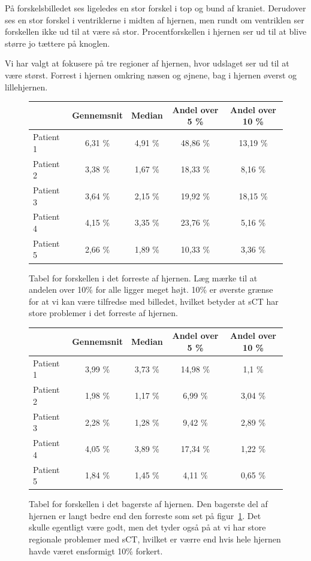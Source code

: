 På forskelsbilledet ses ligeledes en stor forskel i top og bund af
kraniet. Derudover ses en stor forskel i ventriklerne i midten af
hjernen, men rundt om ventriklen ser forskellen ikke ud til at være så
stor. Procentforskellen i hjernen ser ud til at blive større jo tættere
på knoglen.

Vi har valgt at fokusere på tre regioner af hjernen, hvor udslaget ser ud
til at være størst. Forrest i hjernen omkring næsen og øjnene, bag
i hjernen øverst og lillehjernen.

\begin{figure}
    \centering
    \begin{tabular}{| l | c | c | c | c |}
        \hline
         & Gennemsnit & Median & Andel over 5 \% & Andel over 10 \% \\ \hline
        Patient 1 & 6,31 \% & 4,91 \% & 48,86 \% & 13,19 \% \\ \hline
        Patient 2 & 3,38 \% & 1,67 \% & 18,33 \% & 8,16 \% \\ \hline
        Patient 3 & 3,64 \% & 2,15 \% & 19,92 \% & 18,15 \% \\ \hline
        Patient 4 & 4,15 \% & 3,35 \% & 23,76 \% & 5,16 \% \\ \hline
        Patient 5 & 2,66 \% & 1,89 \% & 10,33 \% & 3,36 \% \\ \hline
    \end{tabular}
    \caption{Tabel for forskellen i det forreste af hjernen. Læg mærke til at andelen over 10\% for alle ligger meget højt. 10\% er øverste grænse for at vi kan være tilfredse med billedet, hvilket betyder at sCT har store problemer i det forreste af hjernen.}
    \label{tab:loocv_forresthjerne}
\end{figure}

\begin{figure}
    \centering
    \begin{tabular}{| l | c | c | c | c |}
        \hline
         & Gennemsnit & Median & Andel over 5 \% & Andel over 10 \% \\ \hline
        Patient 1 & 3,99 \% & 3,73 \% & 14,98 \% & 1,1 \% \\ \hline
        Patient 2 & 1,98 \% & 1,17 \% & 6,99 \% & 3,04 \% \\ \hline
        Patient 3 & 2,28 \% & 1,28 \% & 9,42 \% & 2,89 \% \\ \hline
        Patient 4 & 4,05 \% & 3,89 \% & 17,34 \% & 1,22 \% \\ \hline
        Patient 5 & 1,84 \% & 1,45 \% & 4,11 \% & 0,65 \% \\ \hline
    \end{tabular}
    \caption{Tabel for forskellen i det bagerste af hjernen. Den bagerste del af hjernen er langt bedre end den forreste som set på figur~\ref{tab:loocv_forresthjerne}. Det skulle egentligt være godt, men det tyder også på at vi har store regionale problemer med sCT, hvilket er værre end hvis hele hjernen havde været ensformigt 10\% forkert.}
    \label{tab:loocv_bagersthjerne}
\end{figure}

